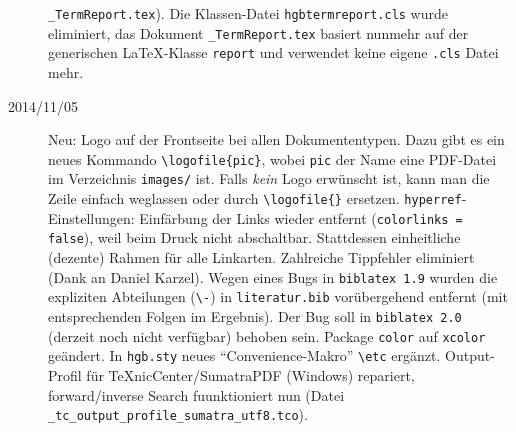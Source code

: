 \begin{sloppypar}
\begin{description}
\texttt{\_TermReport.tex}).
\newline
Die Klassen-Datei \texttt{hgbtermreport.cls} wurde eliminiert, das Dokument \texttt{\_TermReport.tex} basiert nunmehr
auf der generischen LaTeX-Klasse \texttt{report}  und verwendet keine eigene \texttt{.cls} Datei mehr.
%
\item[2014/11/05]
Neu: Logo auf der Frontseite bei allen Dokumententypen. Dazu gibt es ein neues Kommando
\verb!\logofile{pic}!, wobei \verb!pic! der Name eine PDF-Datei im
Verzeichnis \verb!images/! ist. Falls \emph{kein} Logo erwünscht ist, 
kann man die Zeile einfach weglassen oder durch \verb!\logofile{}! ersetzen.
\newline
\texttt{hyperref}-Einstellungen: Einfärbung der Links wieder entfernt (\texttt{colorlinks = false}), weil beim Druck
nicht abschaltbar. Stattdessen einheitliche (dezente) Rahmen für alle Linkarten.
Zahlreiche Tippfehler eliminiert (Dank an Daniel Karzel).
\newline
Wegen eines Bugs in \texttt{biblatex 1.9} wurden die expliziten Abteilungen (\verb!\-!) in \texttt{literatur.bib}
vorübergehend entfernt (mit entsprechenden Folgen im Ergebnis). Der Bug soll in \texttt{biblatex 2.0} (derzeit noch
nicht verfügbar) behoben sein.
\newline
Package \texttt{color} auf \texttt{xcolor} geändert. In \texttt{hgb.sty} neues "`Convenience-Makro"' \verb!\etc! ergänzt.
Output-Profil für TeXnicCenter/SumatraPDF (Windows) repariert, forward/inverse Search fuunktioniert nun
(Datei \verb!_tc_output_profile_sumatra_utf8.tco!).
\end{description}

\end{sloppypar}









